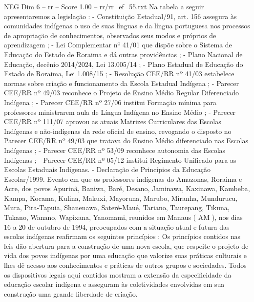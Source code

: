 \begin{textsample}{NEG Dim 6 – rr – Score 1.00 – rr/rr\_ef\_55.txt}
Na tabela a seguir apresentaremos a legislação : - Constituição Estadual/91, art. 156 assegura às comunidades indígenas o uso de suas línguas e da língua portuguesa nos processos de apropriação de conhecimentos, observados seus modos e próprios de aprendizagem ; - Lei Complementar nº 41/01 que dispõe sobre o Sistema de Educação do Estado de Roraima e dá outras providências ; - Plano Nacional de Educação, decênio 2014/2024, Lei 13.005/14 ; - Plano Estadual de Educação do Estado de Roraima, Lei 1.008/15 ; - Resolução CEE/RR nº 41/03 estabelece normas sobre criação e funcionamento da Escola Estadual Indígena ; - Parecer CEE/RR nº 49/03 reconhece o Projeto de Ensino Médio Regular Diferenciado Indígena ; - Parecer CEE/RR nº 27/06 institui Formação mínima para professores ministrarem aula de Língua Indígena no Ensino Médio ; - Parecer CEE/RR nº 111/07 aprovou as atuais Matrizes Curriculares das Escolas Indígenas e não-indígenas da rede oficial de ensino, revogando o disposto no Parecer CEE/RR nº 49/03 que tratava do Ensino Médio diferenciado nas Escolas Indígenas ; - Parecer CEE/RR nº 53/09 reconhece autonomia das Escolas Indígenas ; - Parecer CEE/RR nº 05/12 institui Regimento Unificado para as Escolas Estaduais Indígenas. - Declaração de Princípios da Educação Escolar/1999.
Evento em que os professores indígenas do Amazonas, Roraima e Acre, dos povos Apurinã, Baniwa, Baré, Desano, Jaminawa, Kaxinawa, Kambeba, Kampa, Kocama, Kulina, Makuxi, Mayoruna, Marubo, Miranha, Mundurucu, Mura, Pira-Tapuia, Shanenawa, Sateré-Maué, Tariano, Taurepang, Tikuna, Tukano, Wanano, Wapixana, Yanomami, reunidos em Manaus ( AM ), nos dias 16 a 20 de outubro de 1994, preocupados com a situação atual e futura das escolas indígenas reafirmam os seguintes princípios : Os princípios contidos nas leis dão abertura para a construção de uma nova escola, que respeite o projeto de vida dos povos indígenas por uma educação que valorize suas práticas culturais e lhes dê acesso aos conhecimentos e práticas de outros grupos e sociedades.
Todos os dispositivos legais aqui contidos mostram a extensão da especificidade da educação escolar indígena e asseguram às coletividades envolvidas em sua construção uma grande liberdade de criação.

\end{textsample}
